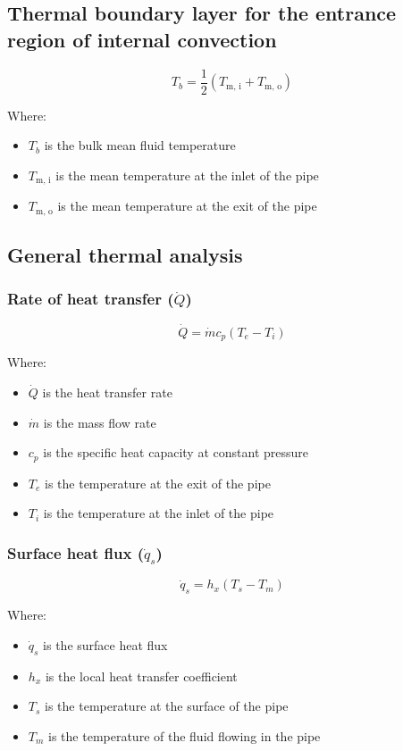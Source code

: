 \documentclass[11pt]{article}
\begin{document}
\subsection{Thermal boundary layer for the entrance region of internal convection}
\label{sec:orge6af4b9}
\[T_b = \frac{1}{2} (T_{\text{m, i}} + T_{\text{m, o}})\]

Where:
\begin{itemize}
\item \(T_b\) is the bulk mean fluid temperature
\item \(T_{\text{m, i}}\) is the mean temperature at the inlet of the pipe
\item \(T_{\text{m, o}}\) is the mean temperature at the exit of the pipe
\end{itemize}

\subsection{General thermal analysis}
\label{sec:orgd6b89e8}

\subsubsection{Rate of heat transfer (\(\dot{Q}\))}
\label{sec:org61586c8}
\[\dot{Q} = \dot{m} c_p (T_e - T_i)\]

Where:
\begin{itemize}
\item \(\dot{Q}\) is the heat transfer rate
\item \(\dot{m}\) is the mass flow rate
\item \(c_p\) is the specific heat capacity at constant pressure
\item \(T_e\) is the temperature at the exit of the pipe
\item \(T_i\) is the temperature at the inlet of the pipe
\end{itemize}

\subsubsection{Surface heat flux (\(\dot{q}_s\))}
\label{sec:org218276b}
\[\dot{q}_s = h_x (T_s - T_m)\]

Where:
\begin{itemize}
\item \(\dot{q}_s\) is the surface heat flux
\item \(h_x\) is the local heat transfer coefficient
\item \(T_s\) is the temperature at the surface of the pipe
\item \(T_m\) is the temperature of the fluid flowing in the pipe
\end{itemize}
\end{document}
